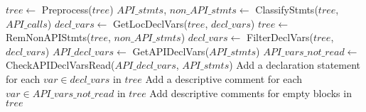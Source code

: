 \begin{algorithmic}[1]
    \State $tree \leftarrow$ Preprocess($tree$)
    \State $API\_stmts$, $non\_API\_stmts \leftarrow$ ClassifyStmts($tree$, $API\_calls$)
	\State $decl\_vars \leftarrow$ GetLocDeclVars($tree$, $decl\_vars$)
	\State $tree \leftarrow$ RemNonAPIStmts($tree$, $non\_API\_stmts$)
	\State $decl\_vars \leftarrow$ FilterDeclVars($tree$, $decl\_vars$)
	\State $API\_decl\_vars \leftarrow$ GetAPIDeclVars($API\_stmts$)
    \State $API\_vars\_not\_read \leftarrow$ CheckAPIDeclVarsRead($API\_decl\_vars$, $API\_stmts$)
	\State Add a declaration statement for each $var \in decl\_vars$ in $tree$
    \State Add a descriptive comment for each $var \in API\_vars\_not\_read$ in $tree$
    \State Add descriptive comments for empty blocks in $tree$
\EndProcedure
\end{algorithmic}